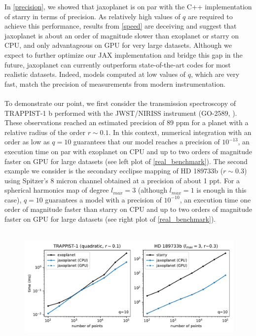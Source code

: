 \documentclass[modern]{aastex631}
\begin{document}
In \autoref{precision}, we showed that \textsf{jaxoplanet} is on par with the C++ implementation of \textsf{starry} in terms of precision. As relatively high values of $q$ are required to achieve this performance, results from \autoref{speed} are deceiving and suggest that \textsf{jaxoplanet} is about an order of magnitude slower than \textsf{exoplanet} or \textsf{starry} on CPU, and only advantageous on GPU for very large datasets. Although we expect to further optimize our \textsf{JAX} implementation and bridge this gap in the future, \textsf{jaxoplanet} can currently outperform state-of-the-art codes for most realistic datasets. Indeed, models computed at low values of $q$, which are very fast, match the precision of measurements from modern instrumentation.\\\\
To demonstrate our point, we first consider the transmission spectroscopy of TRAPPIST-1 b performed with the JWST/NIRISS instrument (GO-2589, \citealt{Lim2023}). These observations reached an estimated precision of 89 ppm for a planet with a relative radius of the order $r\sim0.1$. In this context, numerical integration with an order as low as $q=10$ guarantees that our model reaches a precision of $10^{-13}$, an execution time on par with \textsf{exoplanet} on CPU and up to two orders of magnitude faster on GPU for large datasets (see left plot of \autoref{real_benchmark}). The second example we consider is the secondary ecclipse mapping of HD 189733b ($r\sim0.3$) using Spitzer's 8 micron channel \citep{majeau2012} obtained at a precision of about 1 ppt. For a spherical harmonics map of degree $l_{max}=3$ (although $l_{max}=1$ is enough in this case), $q=10$ guarantees a model with a precision of $10^{-10}$, an execution time one order of magnitude faster than \textsf{starry} on CPU and up to two orders of magnitude faster on GPU for large datasets (see right plot of \autoref{real_benchmark}).\\\\
\begin{figure}[H]
    \begin{center}
        \includegraphics[width=\textwidth]{../workflows/speed/figures/speed_vs_N_realistic.pdf}
        \caption{}
        \label{fig:real_benchmark}
    \end{center}
\end{figure}
\end{document}
